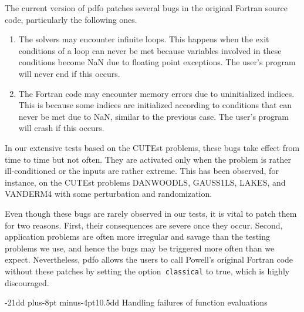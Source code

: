 \documentclass[
    smallextended,  %
    final,          %
]{svjour3}
\makeatletter
\newcommand{\iter}[1][k]{x\ifthenelse{\equal{#1}{}}{}{_{#1}}}
\newcommand{\xpt}[1][k]{\mathcal{Y}\ifthenelse{\equal{#1}{}}{}{_{#1}}}
\def\subsection{\@startsection{subsection}{2}{\z@}%
    {-21dd plus-8pt minus-4pt}{10.5dd}
     {\normalsize\bfseries}}
\makeatother
\begin{document}
The current version of \gls{pdfo} patches several bugs in the original Fortran source code, particularly the following ones.
\begin{enumerate}
    \item The solvers may encounter infinite loops.
    This happens when the exit conditions of a loop can never be met because variables involved in
    these conditions become NaN due to floating point exceptions.
    The user's program will never end if this occurs.
    \item The Fortran code may encounter memory errors due to uninitialized indices.
    This is because some indices are initialized according to conditions that can never be met due to NaN, similar to the previous case.
    The user's program will crash if this occurs.
\end{enumerate}

In our extensive tests based on the CUTEst problems, these bugs take effect from time to time but not often.
They are activated only when the problem is rather ill-conditioned or the inputs are rather
extreme.
This has been observed, for instance, on the CUTEst problems DANWOODLS, GAUSS1LS, LAKES, and
VANDERM4 with some perturbation and randomization.

Even though these bugs are rarely observed in our tests, it is vital to patch them for two reasons.
First, their consequences are severe once they occur. Second, application problems are often more irregular and savage than
the testing problems we use, and hence the bugs may be triggered more often than we expect.
Nevertheless, \gls{pdfo} allows the users to call Powell's original Fortran code without these patches by setting the
option~\texttt{classical} to true, which is highly discouraged.


\subsection{Handling failures of function evaluations}
\label{ssec:barrier}
\end{document}
